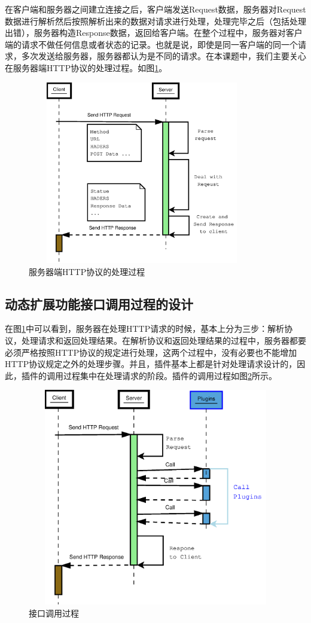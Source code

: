 \documentclass[twoside, xetex]{report}
\begin{document}
	在客户端和服务器之间建立连接之后，客户端发送Request数据，服务器对Request数据进行解析然后按照解析出来的数据对请求进行处理，处理完毕之后（包括处理出错），服务器构造Response数据，返回给客户端。在整个过程中，服务器对客户端的请求不做任何信息或者状态的记录。也就是说，即使是同一客户端的同一个请求，多次发送给服务器，服务器都认为是不同的请求。在本课题中，我们主要关心在服务器端HTTP协议的处理过程。如图\ref{serverhttp}。
	\begin{figure}[htbp]
	\centering
	\includegraphics[height=8cm, width=10cm]{pics/serverhttp.eps}
	\caption{服务器端HTTP协议的处理过程}
	\label{serverhttp}
	\end{figure}
	
\subsection{动态扩展功能接口调用过程的设计}
	在图\ref{serverhttp}中可以看到，服务器在处理HTTP请求的时候，基本上分为三步：解析协议，处理请求和返回处理结果。在解析协议和返回处理结果的过程中，服务器都要必须严格按照HTTP协议的规定进行处理，这两个过程中，没有必要也不能增加HTTP协议规定之外的处理步骤。并且，插件基本上都是针对处理请求设计的，因此，插件的调用过程集中在处理请求的阶段。插件的调用过程如图\ref{httpplugin}所示。
	\begin{figure}[htbp]
	\centering
	\includegraphics[height=9.5cm, width=12cm]{pics/httpplugin.eps}
	\caption{接口调用过程}
	\label{httpplugin}
	\end{figure}
	
\end{document}
